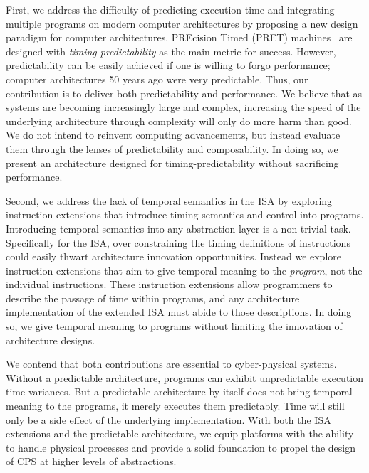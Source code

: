 First, we address the difficulty of predicting execution time and integrating multiple programs on modern computer architectures by proposing a new design paradigm for computer architectures.
PREcision Timed (PRET) machines~\cite{edwards2007case} are designed with \textit{timing-predictability} as the main metric for success.
However, predictability can be easily achieved if one is willing to forgo performance; computer architectures 50 years ago were very predictable.
Thus, our contribution is to deliver both predictability and performance.    
We believe that as systems are becoming increasingly large and complex, increasing the speed of the underlying architecture through complexity will only do more harm than good.
We do not intend to reinvent computing advancements, but instead evaluate them through the lenses of predictability and composability.
In doing so, we present an architecture designed for timing-predictability without sacrificing performance.   

Second, we address the lack of temporal semantics in the ISA by exploring instruction extensions that introduce timing semantics and control into programs.
Introducing temporal semantics into any abstraction layer is a non-trivial task. 
Specifically for the ISA, over constraining the timing definitions of instructions could easily thwart architecture innovation opportunities.
Instead we explore instruction extensions that aim to give temporal meaning to the \emph{program}, not the individual instructions. 
These instruction extensions allow programmers to describe the passage of time within programs, and any architecture implementation of the extended ISA must abide to those descriptions. 
In doing so, we give temporal meaning to programs without limiting the innovation of architecture designs.

We contend that both contributions are essential to cyber-physical systems. 
Without a predictable architecture, programs can exhibit unpredictable execution time variances.    
But a predictable architecture by itself does not bring temporal meaning to the programs, it merely executes them predictably.
Time will still only be a side effect of the underlying implementation.
With both the ISA extensions and the predictable architecture, we equip platforms with the ability to handle physical processes and provide 
a solid foundation to propel the design of CPS at higher levels of abstractions.       
 
